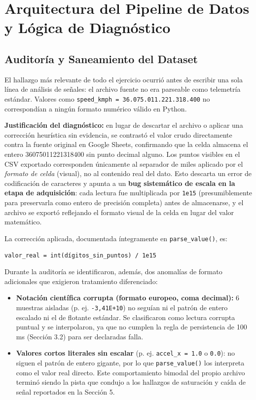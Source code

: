 \documentclass[12pt, letterpaper]{article}
\begin{document}
	\section{Arquitectura del Pipeline de Datos y Lógica de Diagnóstico}
	
	\subsection{Auditoría y Saneamiento del Dataset}
	El hallazgo más relevante de todo el ejercicio ocurrió antes de escribir una sola línea de análisis de señales: el archivo fuente no era parseable como telemetría estándar. Valores como \texttt{speed\_kmph = 36.075.011.221.318.400} no correspondían a ningún formato numérico válido en Python.
	
	\textbf{Justificación del diagnóstico:} en lugar de descartar el archivo o aplicar una corrección heurística sin evidencia, se contrastó el valor crudo directamente contra la fuente original en Google Sheets, confirmando que la celda almacena el entero 36075011221318400 sin punto decimal alguno. Los puntos visibles en el CSV exportado corresponden únicamente al separador de miles aplicado por el \textit{formato de celda} (visual), no al contenido real del dato. Esto descarta un error de codificación de caracteres y apunta a un \textbf{bug sistemático de escala en la etapa de adquisición}: cada lectura fue multiplicada por \texttt{1e15} (presumiblemente para preservarla como entero de precisión completa) antes de almacenarse, y el archivo se exportó reflejando el formato visual de la celda en lugar del valor matemático.
	
	La corrección aplicada, documentada íntegramente en \texttt{parse\_value()}, es:
	\begin{center}
		\texttt{valor\_real = int(dígitos\_sin\_puntos) / 1e15}
	\end{center}
	
	Durante la auditoría se identificaron, además, dos anomalías de formato adicionales que exigieron tratamiento diferenciado:
	\begin{itemize}
		\item \textbf{Notación científica corrupta (formato europeo, coma decimal):} 6 muestras aisladas (p. ej. \texttt{-3,41E+10}) no seguían ni el patrón de entero escalado ni el de flotante estándar. Se clasificaron como lectura corrupta puntual y se interpolaron, ya que no cumplen la regla de persistencia de 100 ms (Sección 3.2) para ser declaradas falla.
		\item \textbf{Valores cortos literales sin escalar} (p. ej. \texttt{accel\_x = 1.0} o \texttt{0.0}): no siguen el patrón de entero gigante, por lo que \texttt{parse\_value()} los interpreta como el valor real directo. Este comportamiento bimodal del propio archivo terminó siendo la pista que condujo a los hallazgos de saturación y caída de señal reportados en la Sección 5.
	\end{itemize}
	
\end{document}
